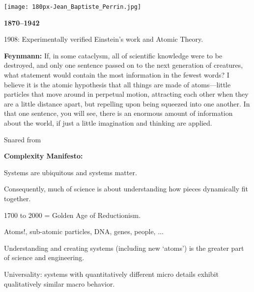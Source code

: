   
  
  \medskip

      
    
\begin{marginfigure}[]
\texttt{[image: 180px-Jean\_Baptiste\_Perrin.jpg]}\\
\end{marginfigure}

    
    \textbf{
        1870--1942}
      
       
        1908: Experimentally verified Einstein's work and Atomic Theory.
      
    
  

  \small

  \textbf{Feynmann:}
    If, in some cataclysm, all of scientific knowledge were to be
    destroyed, and only one sentence passed on to the next generation of
    creatures, what statement would contain the most information in the
    fewest words? I believe it is the atomic hypothesis that all things
    are made of atoms---little particles that move around in perpetual
    motion, attracting each other when they are a little distance apart,
    but repelling upon being squeezed into one another. In that one
    sentence, you will see, there is an enormous amount of information
    about the world, if just a little imagination and thinking are
    applied.
  

  \tiny
  Snared from 



  \small

  \textbf{Complexity Manifesto:}
    
    
      Systems are ubiquitous and systems matter.
    
      Consequently, much of science is about understanding
      how pieces dynamically fit together.
    
      1700 to 2000 = Golden Age of Reductionism.
      
       
        Atoms!, sub-atomic particles, DNA, genes, people, ...
      
    
      Understanding and creating systems (including new `atoms')
      is the greater part of science and engineering.
    
      Universality: systems with quantitatively different micro details
      exhibit qualitatively similar macro behavior.
    
